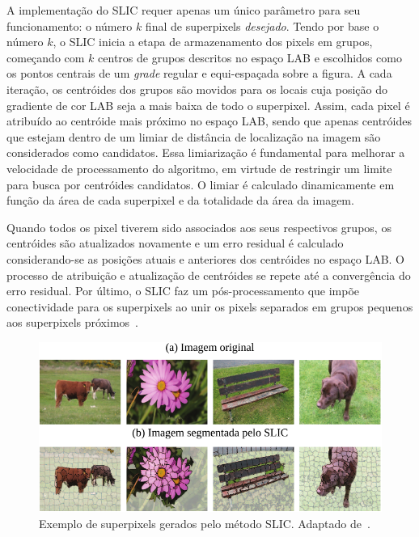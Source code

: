 A implementação do SLIC requer apenas um único parâmetro para seu funcionamento: o número $k$ final de superpixels \textit{desejado}. 
Tendo por base o número $k$, o SLIC inicia a etapa de armazenamento dos pixels em grupos, começando com $k$ centros de grupos descritos no espaço LAB e escolhidos como os pontos centrais de um \textit{grade} regular e equi-espaçada sobre a figura.
A cada iteração, os centróides dos grupos são movidos para os locais cuja posição do gradiente de cor LAB seja a mais baixa de todo o superpixel.
Assim, cada pixel é atribuído ao centróide mais próximo no espaço LAB, sendo que apenas centróides que estejam dentro de um limiar de distância de localização na imagem são considerados como candidatos.
Essa limiarização é fundamental para melhorar a velocidade de processamento do algoritmo, em virtude de restringir um limite para busca por centróides candidatos.
O limiar é calculado dinamicamente em função da área de cada superpixel e da totalidade da área da imagem.

Quando todos os pixel tiverem sido associados aos seus respectivos grupos, os centróides são atualizados novamente e um erro residual é calculado considerando-se as posições atuais e anteriores dos centróides no espaço LAB.
O processo de atribuição e atualização de centróides se repete até a convergência do erro residual.
Por último, o SLIC faz um pós-processamento que impõe conectividade para os superpixels ao unir os pixels separados em grupos pequenos aos superpixels próximos~\cite{Achanta2012}.

\begin{figure}[!t]
\centering
\includegraphics[scale=1]{_fig/ie_slic.pdf}
\vspace{-8px}
\caption[Exemplo de superpixels gerados pelo método SLIC]{Exemplo de superpixels gerados pelo método SLIC.
Adaptado de~.}
\label{fig:ie_slic}
\end{figure}

